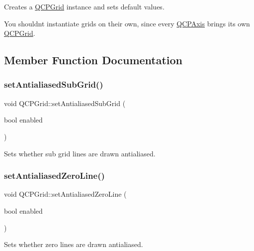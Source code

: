 Creates a \hyperlink{class_q_c_p_grid}{Q\+C\+P\+Grid} instance and sets default values.

You shouldn\textquotesingle{}t instantiate grids on their own, since every \hyperlink{class_q_c_p_axis}{Q\+C\+P\+Axis} brings its own \hyperlink{class_q_c_p_grid}{Q\+C\+P\+Grid}. 

\subsection{Member Function Documentation}
\hypertarget{class_q_c_p_grid_a5692310ba183721a413d60951407d114}{}\label{class_q_c_p_grid_a5692310ba183721a413d60951407d114} 
\subsubsection{\texorpdfstring{set\+Antialiased\+Sub\+Grid()}{setAntialiasedSubGrid()}}
{\footnotesize\ttfamily void Q\+C\+P\+Grid\+::set\+Antialiased\+Sub\+Grid (\begin{DoxyParamCaption}\item[{bool}]{enabled }\end{DoxyParamCaption})}

Sets whether sub grid lines are drawn antialiased. \hypertarget{class_q_c_p_grid_a3cc6d54647393ee71afb6da56af07aa4}{}\label{class_q_c_p_grid_a3cc6d54647393ee71afb6da56af07aa4} 
\subsubsection{\texorpdfstring{set\+Antialiased\+Zero\+Line()}{setAntialiasedZeroLine()}}
{\footnotesize\ttfamily void Q\+C\+P\+Grid\+::set\+Antialiased\+Zero\+Line (\begin{DoxyParamCaption}\item[{bool}]{enabled }\end{DoxyParamCaption})}

Sets whether zero lines are drawn antialiased. \hypertarget{class_q_c_p_grid_aa05ab9816ffb440908171e45e833b593}{}\label{class_q_c_p_grid_aa05ab9816ffb440908171e45e833b593} 
